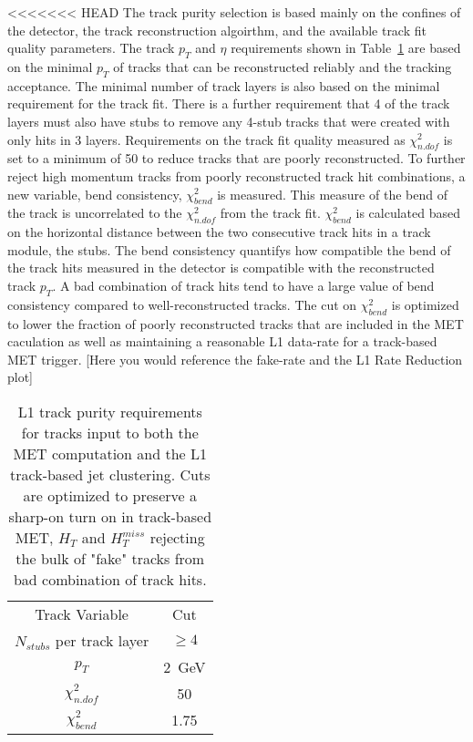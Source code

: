 <<<<<<< HEAD
The track purity selection is based mainly on the confines of the detector, the track reconstruction algoirthm, and  the available track fit quality parameters. The track $p_{T}$ and $\eta$ requirements shown in Table~\ref{tab:trkpurity} are based on the minimal $p_{T}$ of tracks that can be reconstructed reliably and the tracking acceptance. The minimal number of track layers is also based on the minimal requirement for the track fit. There is a further requirement that 4 of the track layers must also have stubs to remove any 4-stub tracks that were created with only hits in 3 layers. Requirements on the track fit quality measured as $\chi^{2}_{n.dof}$ is set to a minimum of 50 to reduce tracks that are poorly reconstructed. To further reject high momentum tracks from poorly reconstructed track hit combinations, a new variable, bend consistency, $\chi^{2}_{bend}$ is measured. This measure of the bend of the track is uncorrelated to the $\chi^{2}_{n.dof}$ from the track fit. $\chi^{2}_{bend}$ is calculated based on the horizontal distance between the two consecutive track hits in a track module, the stubs. The bend consistency quantifys how compatible the bend of the track hits measured in the detector is compatible with the reconstructed track $p_{T}$. A bad combination of track hits tend to have a large value of bend consistency compared to well-reconstructed tracks. The cut on $\chi^{2}_{bend}$ is optimized to lower the fraction of poorly reconstructed tracks that are included in the MET caculation as well as maintaining a reasonable L1 data-rate for a track-based MET trigger. [Here you would reference the fake-rate and the L1 Rate Reduction plot]
\begin{table}[h]
\begin{tabular}{|c|c|}
Track Variable & Cut\\
$N_{stubs}$ per track layer&$\geq 4$ \\
$p_{T}$ & 2~GeV \\
$\chi^{2}_{n.dof}$ & 50 \\
$\chi^{2}_{bend}$  & 1.75 \\

\end{tabular}
\caption{ L1 track purity requirements for tracks input to both the MET computation and the L1 track-based jet clustering. Cuts are optimized to preserve a sharp-on turn on in track-based MET, $H_{T}$ and $H^{miss}_{T}$ rejecting the bulk of "fake" tracks from bad combination of track hits.}
\label{tab:trkpurity}
\end{table}

